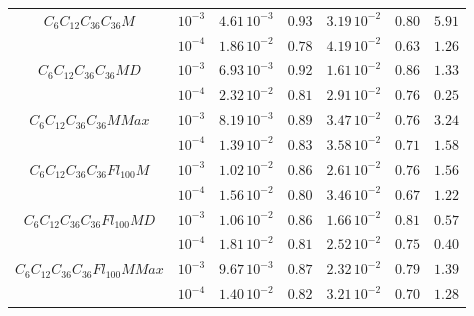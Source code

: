 \begin{tiny}
\begin{table}[H]
\begin{center}
\begin{tabular}{ |c|c|c|c|c|c|c| }
			\hline\hline
			\multirow{2}{*}{$C_6C_{12}C_{36}C_{36}M$}
			& $10^{-3}$ & $4.61\,10^{-3}$ & $0.93$ & $3.19\,10^{-2}$ & $0.80$ & $5.91$ \\ \cline{2-7}
			& $10^{-4}$ & $1.86\,10^{-2}$ & $0.78$ & $4.19\,10^{-2}$ & $0.63$ & $1.26$ \\ \cline{2-7}
			\hline\hline
			\multirow{2}{*}{$C_6C_{12}C_{36}C_{36}MD$}
			& $10^{-3}$ & $6.93\,10^{-3}$ & $0.92$ & $1.61\,10^{-2}$ & $0.86$ & $1.33$ \\ \cline{2-7}
			& $10^{-4}$ & $2.32\,10^{-2}$ & $0.81$ & $2.91\,10^{-2}$ & $0.76$ & $0.25$ \\ \cline{2-7}
			\hline\hline
			\multirow{2}{*}{$C_6C_{12}C_{36}C_{36}MMax$}
			& $10^{-3}$ & $8.19\,10^{-3}$ & $0.89$ & $3.47\,10^{-2}$ & $0.76$ & $3.24$ \\ \cline{2-7}
			& $10^{-4}$ & $1.39\,10^{-2}$ & $0.83$ & $3.58\,10^{-2}$ & $0.71$ & $1.58$ \\ \cline{2-7}
			\hline\hline
			\multirow{2}{*}{$C_6C_{12}C_{36}C_{36}Fl_{100}M$}
			& $10^{-3}$ & $1.02\,10^{-2}$ & $0.86$ & $2.61\,10^{-2}$ & $0.76$ & $1.56$ \\ \cline{2-7}
			& $10^{-4}$ & $1.56\,10^{-2}$ & $0.80$ & $3.46\,10^{-2}$ & $0.67$ & $1.22$ \\ \cline{2-7}
			\hline\hline
			\multirow{2}{*}{$C_6C_{12}C_{36}C_{36}Fl_{100}MD$}
			& $10^{-3}$ & $1.06\,10^{-2}$ & $0.86$ & $1.66\,10^{-2}$ & $0.81$ & $0.57$ \\ \cline{2-7}
			& $10^{-4}$ & $1.81\,10^{-2}$ & $0.81$ & $2.52\,10^{-2}$ & $0.75$ & $0.40$ \\ \cline{2-7}
			\hline\hline
			\multirow{2}{*}{$C_6C_{12}C_{36}C_{36}Fl_{100}MMax$}
			& $10^{-3}$ & $9.67\,10^{-3}$ & $0.87$ & $2.32\,10^{-2}$ & $0.79$ & $1.39$ \\ \cline{2-7}
			& $10^{-4}$ & $1.40\,10^{-2}$ & $0.82$ & $3.21\,10^{-2}$ & $0.70$ & $1.28$ \\ \cline{2-7} \hline
		\end{tabular}\hfill%
	\end{center}
	
\end{table}



\end{tiny}